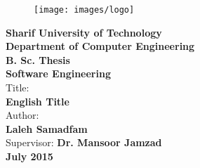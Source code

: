 \clearpage
\thispagestyle{empty}
\begin{latin}
\vspace*{-2cm}
\begin{figure}
\centerline{\texttt{[image: images/logo]}}
\end{figure}
\vspace{0.5cm}
\begin{center}
{\large\bf  Sharif University of Technology  }\\
{\large \bf  Department of Computer Engineering}\\
\vspace{0.2cm}
{\large\bf  B. Sc. Thesis  }\\
{\large \bf  Software Engineering}\\
\vspace{1.2cm}
Title:\\
{\Huge \bf English Title}\vspace{0.5cm}\\
Author:\vspace{0.3cm}\\
{\LARGE  \bf Laleh Samadfam }\\
\vspace{0.5cm}
Supervisor: {\Large \bf Dr. Mansoor Jamzad
}\\
\vspace{1cm}
{\large \bf July 2015}
\end{center}
\end{latin}

